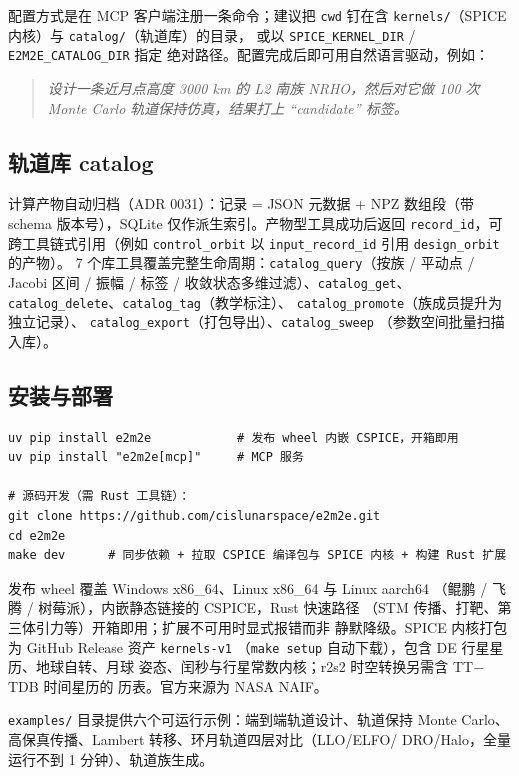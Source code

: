 配置方式是在 MCP 客户端注册一条命令；建议把 \texttt{cwd} 钉在含
\texttt{kernels/}（SPICE 内核）与 \texttt{catalog/}（轨道库）的目录，
或以 \texttt{SPICE\_KERNEL\_DIR} / \texttt{E2M2E\_CATALOG\_DIR} 指定
绝对路径。配置完成后即可用自然语言驱动，例如：

\begin{quote}\itshape
设计一条近月点高度 3000 km 的 L2 南族 NRHO，然后对它做 100 次
Monte Carlo 轨道保持仿真，结果打上 ``candidate'' 标签。
\end{quote}

\subsection{轨道库 catalog}

计算产物自动归档（ADR 0031）：记录 = JSON 元数据 + NPZ 数组段（带
schema 版本号），SQLite 仅作派生索引。产物型工具成功后返回
\texttt{record\_id}，可跨工具链式引用（例如 \texttt{control\_orbit}
以 \texttt{input\_record\_id} 引用 \texttt{design\_orbit} 的产物）。
7 个库工具覆盖完整生命周期：\texttt{catalog\_query}（按族 / 平动点 /
Jacobi 区间 / 振幅 / 标签 / 收敛状态多维过滤）、\texttt{catalog\_get}、
\texttt{catalog\_delete}、\texttt{catalog\_tag}（教学标注）、
\texttt{catalog\_promote}（族成员提升为独立记录）、
\texttt{catalog\_export}（打包导出）、\texttt{catalog\_sweep}
（参数空间批量扫描入库）。

\subsection{安装与部署}

\begin{lstlisting}[style=e2bash,caption={安装与 SPICE 内核配置},label=lst:install]
uv pip install e2m2e            # 发布 wheel 内嵌 CSPICE，开箱即用
uv pip install "e2m2e[mcp]"     # MCP 服务

# 源码开发（需 Rust 工具链）：
git clone https://github.com/cislunarspace/e2m2e.git
cd e2m2e
make dev      # 同步依赖 + 拉取 CSPICE 编译包与 SPICE 内核 + 构建 Rust 扩展
\end{lstlisting}

发布 wheel 覆盖 Windows x86\_64、Linux x86\_64 与 Linux aarch64
（鲲鹏 / 飞腾 / 树莓派），内嵌静态链接的 CSPICE，Rust 快速路径
（STM 传播、打靶、第三体引力等）开箱即用；扩展不可用时显式报错而非
静默降级。SPICE 内核打包为 GitHub Release 资产 \texttt{kernels-v1}
（\texttt{make setup} 自动下载），包含 DE 行星星历、地球自转、月球
姿态、闰秒与行星常数内核；r2s2 时空转换另需含 TT$-$TDB 时间星历的
历表。官方来源为 NASA NAIF。

\texttt{examples/} 目录提供六个可运行示例：端到端轨道设计、轨道保持
Monte Carlo、高保真传播、Lambert 转移、环月轨道四层对比（LLO/ELFO/
DRO/Halo，全量运行不到 1 分钟）、轨道族生成。
